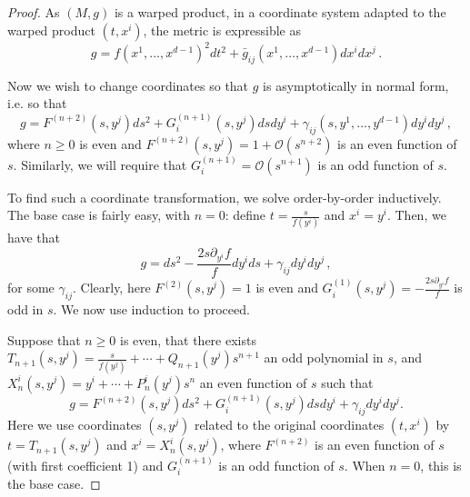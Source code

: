 \documentclass[10pt,a4paper]{amsart}
\newcommand{\II}{{\rm  I\hspace{-.2mm}I}}
\renewcommand\geq{\geqslant}
\begin{document}
\begin{proof}
As $(M,g)$ is a warped product, in a coordinate system adapted to the warped product $(t, x^i)$, the metric is expressible as
$$g = f(x^1, \ldots, x^{d-1})^2 dt^2 + \bar{g}_{ij}(x^1, \ldots, x^{d-1}) dx^i dx^j\,.$$

Now we wish to change coordinates so that $g$ is asymptotically in normal form, i.e. so that
$$g = F^{(n+2)}(s,y^j) ds^2 + G_i^{(n+1)}(s,y^j) ds dy^i + \gamma_{ij}(s,y^1,\ldots,y^{d-1}) dy^i dy^j\,,$$
where $n \geq 0$ is even and $F^{(n+2)}(s,y^j) = 1 + \mathcal{O}(s^{n+2})$ is an even function of $s$. Similarly, we will require that $G_i^{(n+1)} = \mathcal{O}(s^{n+1})$ is an odd function of $s$.

To find such a coordinate transformation, we solve order-by-order inductively. The base case is fairly easy, with $n=0$: define $t = \frac{s}{f(y^i)}$ and $x^i = y^i$. Then, we have that
$$g = ds^2 - \frac{2s \partial_{y^i} f}{f}  dy^i ds + \gamma_{ij} dy^i dy^j \,,$$
for some $\gamma_{ij}$. Clearly, here $F^{(2)}(s,y^j) = 1$ is even and $G_i^{(1)}(s,y^j) = -\frac{2s \partial_{y^i} f}{f}$ is odd in $s$.
We now use induction to proceed. 

Suppose that $n \geq 0$ is even, that there exists $T_{n+1}(s,y^j) = \frac{s}{f(y^j)} + \cdots + Q_{n+1}(y^j) s^{n+1}$ an odd polynomial in $s$, and $X^i_{n}(s,y^j) = y^i + \cdots + P^i_{n}(y^j) s^{n}$ an even function of $s$ such that
$$g = F^{(n+2)}(s,y^j) ds^2 + G_i^{(n+1)}(s,y^j) ds dy^i + \gamma_{ij} dy^i dy^j.$$
Here we use coordinates $(s,y^j)$ related to the original coordinates $(t,x^i)$ by
$t = T_{n+1}(s,y^j)$ and $x^i = X^i_{n}(s,y^j)$, where $F^{(n+2)}$ is an even function of $s$ (with first coefficient 1)
and $G_i^{(n+1)}$ is an odd function of $s$. When $n=0$, this is the base case.


\end{proof}
\end{document}
